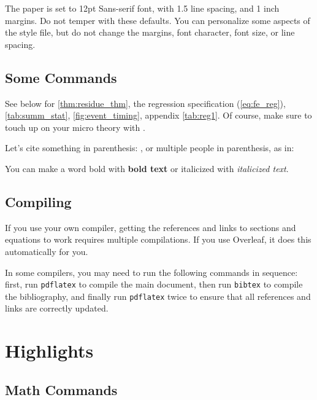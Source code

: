 \documentclass[12pt]{article}
\begin{document}
The paper is set to 12pt Sans-serif font, with 1.5 line spacing, and 1 inch margins. Do not temper with these defaults. You can personalize some aspects of the style file, but do not change the margins, font character, font size, or line spacing.

\subsection{Some Commands}

See below for \autoref{thm:residue_thm}, the regression specification (\ref{eq:fe_reg}), \autoref{tab:summ_stat}, \autoref{fig:event_timing}, appendix \autoref{tab:reg1}. Of course, make sure to touch up on your micro theory with \cite{mas1995microeconomic}. 

Let's cite something in parenthesis: \citep{cosar2019}, or multiple people in parenthesis, as in: \citep{mas1995microeconomic, cosar2019}

You can make a word bold with \textbf{bold text} or italicized with \textit{italicized text}.

\subsection{Compiling}
If you use your own compiler, getting the references and links to sections and equations to work requires multiple compilations. If you use Overleaf, it does this automatically for you. 

In some compilers, you may need to run the following commands in sequence: first, run \texttt{pdflatex} to compile the main document, then run \texttt{bibtex} to compile the bibliography, and finally run \texttt{pdflatex} twice to ensure that all references and links are correctly updated.

\section{Highlights}

\subsection{Math Commands}
\end{document}
